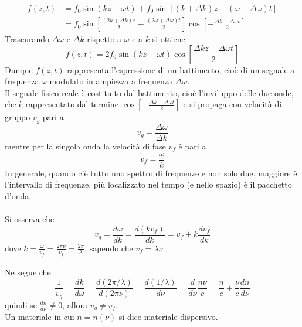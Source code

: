 \documentclass{article}
\begin{document}
\begin{equation}
\begin{split}
    f(z,t)&=f_0\sin(kz - \omega t)+ f_0\sin[(k+\Delta k)z-(\omega+\Delta\omega)t]\\
    &=f_0\sin\left[\frac{(2k+\Delta k)z}{2}-\frac{(2\omega+\Delta\omega)t}{2}\right]\cos\left[-\frac{\Delta k-\Delta\omega t}{2}\right]
    \nonumber
\end{split}
\end{equation}
Trascurando $\Delta\omega$ e $\Delta k$ rispetto a $\omega$ e a $k$ si ottiene
\begin{equation}
    f(z,t)=2f_0\sin(kz-\omega t)\cos\left[\frac{\Delta kz-\Delta\omega t}{2}\right]
    \nonumber
\end{equation}
Dunque $f(z,t)$ rappresenta l’espressione di un battimento, cioè di un segnale a frequenza $\omega$ modulato in ampiezza a frequenza $\Delta\omega$.\\
Il segnale fisico reale è costituito dal battimento, cioè l’inviluppo delle due onde, che è rappresentato dal termine $\cos\left[-\frac{\Delta k-\Delta\omega t}{2}\right]$ e si propaga con velocità di gruppo $v_g$ pari a
\begin{equation}
    v_g=\frac{\Delta\omega}{\Delta k}
    \nonumber
\end{equation}
mentre per la singola onda la velocità di fase $v_f$ è pari a
\begin{equation}
    v_f=\frac{\omega}{k}
    \nonumber
\end{equation}
In generale, quando c’è tutto uno spettro di frequenze e non solo due, maggiore è l’intervallo di frequenze, più localizzato nel tempo (e nello spazio) è il pacchetto d’onda.\\
\\
Si osserva che 
\begin{equation}
    v_g=\frac{d\omega}{dk}=\frac{d(kv_f)}{dk}=v_f+k\frac{dv_f}{dk}
    \nonumber
\end{equation}
dove $ k= \frac{\omega}{v_f} =\frac{2\pi\nu}{v_f} =\frac{2\pi}{\lambda} $, sapendo che $ v_f = \lambda \nu $. \\
\\
Ne segue che
\begin{equation}
    \frac{1}{v_g}=\frac{dk}{d\omega}=\frac{d(2\pi/\lambda)}{d(2\pi \nu)}=\frac{d(1/\lambda)}{d\nu}=\frac{d}{d\nu}\frac{n\nu}{c}=\frac{n}{c}+\frac{\nu}{c}\frac{dn}{d\nu}
    \nonumber
\end{equation}
quindi se $\frac{dn}{d\nu}\neq0$, allora $v_g\neq v_f$.\\
Un materiale in cui $n = n(\nu)$ si dice materiale dispersivo.
\end{document}
